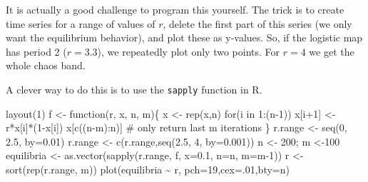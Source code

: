 \documentclass[
  a4paper,
  DIV=11,
  numbers=noendperiod,
  oneside]{scrreprt}
\newenvironment{Shaded}{}{}
\newcommand{\AttributeTok}[1]{\textcolor[rgb]{0.84,0.23,0.29}{#1}}
\newcommand{\CommentTok}[1]{\textcolor[rgb]{0.42,0.45,0.49}{#1}}
\newcommand{\ControlFlowTok}[1]{\textcolor[rgb]{0.84,0.23,0.29}{#1}}
\newcommand{\DecValTok}[1]{\textcolor[rgb]{0.00,0.36,0.77}{#1}}
\newcommand{\FloatTok}[1]{\textcolor[rgb]{0.00,0.36,0.77}{#1}}
\newcommand{\FunctionTok}[1]{\textcolor[rgb]{0.44,0.26,0.76}{#1}}
\newcommand{\NormalTok}[1]{\textcolor[rgb]{0.14,0.16,0.18}{#1}}
\newcommand{\OtherTok}[1]{\textcolor[rgb]{0.44,0.26,0.76}{#1}}
\newcommand{\SpecialCharTok}[1]{\textcolor[rgb]{0.00,0.36,0.77}{#1}}
\newcommand{\StringTok}[1]{\textcolor[rgb]{0.01,0.18,0.38}{#1}}
\begin{document}
It is actually a good challenge to program this yourself. The trick is
to create time series for a range of values of \(r\), delete the first
part of this series (we only want the equilibrium behavior), and plot
these as y-values. So, if the logistic map has period 2 (\(r = 3.3\)),
we repeatedly plot only two points. For \(r = 4\) we get the whole chaos
band.

A clever way to do this is to use the \texttt{sapply} function in R.

\begin{Shaded}
\begin{Highlighting}[]
\FunctionTok{layout}\NormalTok{(}\DecValTok{1}\NormalTok{)}
\NormalTok{f }\OtherTok{\textless{}{-}} \ControlFlowTok{function}\NormalTok{(r, x, n, m)\{}
\NormalTok{  x }\OtherTok{\textless{}{-}} \FunctionTok{rep}\NormalTok{(x,n)}
  \ControlFlowTok{for}\NormalTok{(i }\ControlFlowTok{in} \DecValTok{1}\SpecialCharTok{:}\NormalTok{(n}\DecValTok{{-}1}\NormalTok{)) x[i}\SpecialCharTok{+}\DecValTok{1}\NormalTok{] }\OtherTok{\textless{}{-}}\NormalTok{ r}\SpecialCharTok{*}\NormalTok{x[i]}\SpecialCharTok{*}\NormalTok{(}\DecValTok{1}\SpecialCharTok{{-}}\NormalTok{x[i])}
\NormalTok{  x[}\FunctionTok{c}\NormalTok{((n}\SpecialCharTok{{-}}\NormalTok{m)}\SpecialCharTok{:}\NormalTok{n)] }\CommentTok{\# only return last m iterations}
\NormalTok{\}}
\NormalTok{r.range }\OtherTok{\textless{}{-}} \FunctionTok{seq}\NormalTok{(}\DecValTok{0}\NormalTok{, }\FloatTok{2.5}\NormalTok{, }\AttributeTok{by=}\FloatTok{0.01}\NormalTok{) }
\NormalTok{r.range }\OtherTok{\textless{}{-}} \FunctionTok{c}\NormalTok{(r.range,}\FunctionTok{seq}\NormalTok{(}\FloatTok{2.5}\NormalTok{, }\DecValTok{4}\NormalTok{, }\AttributeTok{by=}\FloatTok{0.001}\NormalTok{)) }
\NormalTok{n }\OtherTok{\textless{}{-}} \DecValTok{200}\NormalTok{; m }\OtherTok{\textless{}{-}}\DecValTok{100} 
\NormalTok{equilibria }\OtherTok{\textless{}{-}} \FunctionTok{as.vector}\NormalTok{(}\FunctionTok{sapply}\NormalTok{(r.range, f,  }\AttributeTok{x=}\FloatTok{0.1}\NormalTok{, }\AttributeTok{n=}\NormalTok{n, }\AttributeTok{m=}\NormalTok{m}\DecValTok{{-}1}\NormalTok{))}
\NormalTok{r }\OtherTok{\textless{}{-}} \FunctionTok{sort}\NormalTok{(}\FunctionTok{rep}\NormalTok{(r.range, m))}
\FunctionTok{plot}\NormalTok{(equilibria }\SpecialCharTok{\textasciitilde{}}\NormalTok{ r, }\AttributeTok{pch=}\DecValTok{19}\NormalTok{,}\AttributeTok{cex=}\NormalTok{.}\DecValTok{01}\NormalTok{,}\AttributeTok{bty=}\StringTok{\textquotesingle{}n\textquotesingle{}}\NormalTok{)}
\end{Highlighting}
\end{Shaded}
\end{document}
